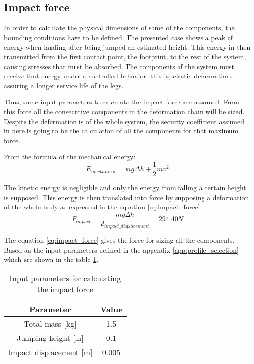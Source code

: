 \subsection{Impact force} %
\label{sub:impact_force}
In order to calculate the physical dimensions of some of the components, the bounding conditions have to be defined.
The presented case shows a peak of energy when landing after being jumped an estimated height.
This energy in then transmitted from the first contact point, the footprint, to the rest of the system, causing stresses that must be absorbed.
The components of the system must receive that energy under a controlled behavior -this is, elastic deformations- assuring a longer service life of the legs.

Thus, some input parameters to calculate the impact force are assumed.
From this force all the consecutive components in the deformation chain will be sized.
Despite the deformation is of the whole system, the security coefficient assumed in here is going to be the calculation of all the components for that maximum force.

From the formula of the mechanical energy:
\begin{equation}
  E_{mechanical} = m g \Delta h + \frac{1}{2} m v^{2}
\end{equation}

The kinetic energy is negligible and only the energy from falling a certain height is supposed.
This energy is then translated into force by supposing a deformation of the whole body as expressed in the equation \ref{eq:impact_force}.
\begin{equation}
\label{eq:impact_force}
  F_{impact} = \frac{m g \Delta h}{d_{impact\_displacement}} = 294.40 N 
\end{equation}

The equation \ref{eq:impact_force} gives the force for sizing all the components.
Based on the input parameters defined in the appendix \ref{app:profile_selection} which are shown in the table \ref{tab:input_parameter_impact_force}.
\begin{table}
\begin{center}
\begin{tabular}{c | c}
  Parameter & Value \\
  \hline
  Total mass [kg] & 1.5 \\
  Jumping height [m] & 0.1 \\
  Impact displacement [m] & 0.005
\end{tabular}
\caption{Input parameters for calculating the impact force}
\label{tab:input_parameter_impact_force}
\end{center}
\end{table}

